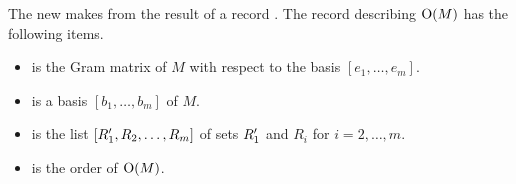 \documentclass{amsart} %
\begin{document}
\par
The new  makes from  the result of   
a record .
The record  describing $\mathord{\mathrm{O}}(M)$
has the following items.
%
\begin{itemize}
\item {} is the Gram matrix of $M$ with respect to the basis $[e_1, \dots, e_m]$.
\item {} is a  basis $[b_1, \dots, b_m]$ of $M$.
\item {} is the list $[R_1^{\prime}, R_2, \dots, R_m]$ 
of sets $R_1^{\prime}$ and $R_i $ for $i=2, \dots, m$.
\item {} is the order of $\mathord{\mathrm{O}}(M)$.
\end{itemize}

%


%
\end{document}
